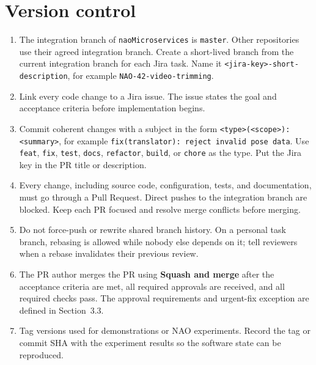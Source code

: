\documentclass[12pt,a4paper]{article}
\begin{document}
\section{Version control}

\begin{enumerate}

\item The integration branch of \texttt{naoMicroservices} is \texttt{master}. Other repositories use their agreed integration branch. Create a short-lived branch from the current integration branch for each Jira task. Name it \texttt{\textless{}jira-key\textgreater{}-short-description}, for example \texttt{NAO-42-video-trimming}.

\item Link every code change to a Jira issue. The issue states the goal and acceptance criteria before implementation begins.

\item Commit coherent changes with a subject in the form \texttt{\textless{}type\textgreater{}(\textless{}scope\textgreater{}): \textless{}summary\textgreater{}}, for example \texttt{fix(translator): reject invalid pose data}. Use \texttt{feat}, \texttt{fix}, \texttt{test}, \texttt{docs}, \texttt{refactor}, \texttt{build}, or \texttt{chore} as the type. Put the Jira key in the PR title or description.

\item Every change, including source code, configuration, tests, and documentation, must go through a Pull Request. Direct pushes to the integration branch are blocked. Keep each PR focused and resolve merge conflicts before merging.

\item Do not force-push or rewrite shared branch history. On a personal task branch, rebasing is allowed while nobody else depends on it; tell reviewers when a rebase invalidates their previous review.

\item The PR author merges the PR using \textbf{Squash and merge} after the acceptance criteria are met, all required approvals are received, and all required checks pass. The approval requirements and urgent-fix exception are defined in Section~3.3.

\item Tag versions used for demonstrations or NAO experiments. Record the tag or commit SHA with the experiment results so the software state can be reproduced.

\end{enumerate}
\end{document}
